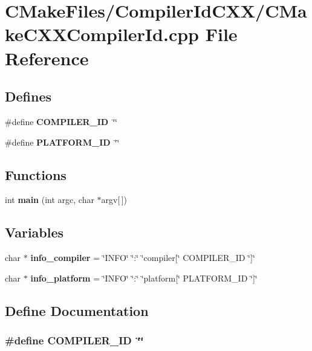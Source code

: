 \section{CMakeFiles/CompilerIdCXX/CMakeCXXCompilerId.cpp File Reference}
\label{CMakeFiles_2CompilerIdCXX_2CMakeCXXCompilerId_8cpp}
\subsection*{Defines}
\begin{DoxyCompactItemize}
\item 
\#define {\bf COMPILER\_\-ID}~\char`\"{}\char`\"{}
\item 
\#define {\bf PLATFORM\_\-ID}~\char`\"{}\char`\"{}
\end{DoxyCompactItemize}
\subsection*{Functions}
\begin{DoxyCompactItemize}
\item 
int {\bf main} (int argc, char $\ast$argv[$\,$])
\end{DoxyCompactItemize}
\subsection*{Variables}
\begin{DoxyCompactItemize}
\item 
char $\ast$ {\bf info\_\-compiler} = \char`\"{}INFO\char`\"{} \char`\"{}:\char`\"{} \char`\"{}compiler[\char`\"{} COMPILER\_\-ID \char`\"{}]\char`\"{}
\item 
char $\ast$ {\bf info\_\-platform} = \char`\"{}INFO\char`\"{} \char`\"{}:\char`\"{} \char`\"{}platform[\char`\"{} PLATFORM\_\-ID \char`\"{}]\char`\"{}
\end{DoxyCompactItemize}


\subsection{Define Documentation}
\subsubsection[{COMPILER\_\-ID}]{\setlength{\rightskip}{0pt plus 5cm}\#define COMPILER\_\-ID~\char`\"{}\char`\"{}}\label{CMakeFiles_2CompilerIdCXX_2CMakeCXXCompilerId_8cpp_a81dee0709ded976b2e0319239f72d174}
